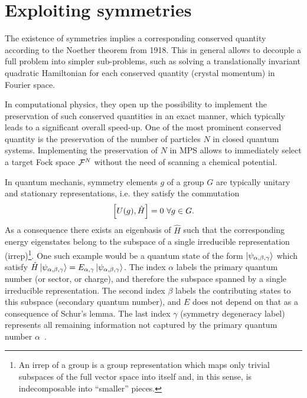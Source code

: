 \section{Exploiting symmetries}
\label{sec:exploiting_symmetries}
%
%
The existence of symmetries implies a corresponding conserved quantity according to the Noether theorem from 1918.
This in general allows to decouple a full problem into simpler sub-problems, such as solving a translationally invariant quadratic Hamiltonian for each conserved quantity (crystal momentum) in Fourier space.

In computational physics, they open up the possibility to implement the preservation of such conserved quantities in an exact manner, which typically leads to a significant overall speed-up.
One of the most prominent conserved quantity is the preservation of the number of particles $N$ in closed quantum systems.
Implementing the preservation of $N$ in MPS allows to immediately select a target Fock space $\mathcal{F}^N$ without the need of scanning a chemical potential.

In quantum mechanis, symmetry elements $g$ of a group $G$ are typically unitary and stationary representations, i.e. they satisfy the commutation
\begin{align}
    \left[ U(g),\hat H \right] = 0\ \forall g\in G.
\end{align}
As a consequence there exists an eigenbasis of $\hat H$ such that the corresponding energy eigenstates belong to the subspace of a single irreducible representation (irrep)\footnote{An irrep of a group is a group representation which maps only trivial subspaces of the full vector space into itself and, in this sense, is indecomposable into ``smaller'' pieces.}.
One such example would be a quantum state of the form $\ket{\psi_{\alpha,\beta,\gamma}}$ which satisfy $\hat H\ket{\psi_{\alpha,\beta,\gamma}} = E_{\alpha,\gamma}\ket{\psi_{\alpha,\beta,\gamma}}$.
The index $\alpha$ labels the primary quantum number (or sector, or charge), and therefore the subspace spanned by a single irreducible representation.
The second index $\beta$ labels the contributing states to this subspace (secondary quantum number), and $E$ does not depend on that as a consequence of Schur's lemma.
The last index $\gamma$ (symmetry degeneracy label) represents all remaining information not captured by the primary quantum number $\alpha$~\cite{Silvi2019}.

